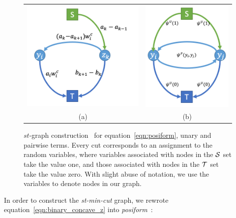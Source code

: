 \documentclass[sigconf, anonymous, review]{acmart}
\renewcommand{\cite}{\citep}
\begin{document}
\begin{figure}[t]
  \centering
  \setlength{\tabcolsep}{2pt}
  \begin{tabular}{cc}
    \includegraphics[width=0.54\columnwidth]{Methodology/figures/ho.png}&
                                                                         \includegraphics[width=0.4\columnwidth]{Methodology/figures/up.png}\\
                                                                         {\small (a)} & {\small (b)} 
  \end{tabular}
  \caption{\label{fig:stmincut} $st$-graph
    construction~\cite{gouldlearning} for
    equation~\eqref{eqn:posiform}, unary and pairwise terms.
    Every cut corresponds to an assignment to the random
    variables, where variables associated with nodes in the
    ${\cal S}$ set take the value one, and those associated with
    nodes in the $\T$ set take the value zero. With slight abuse
    of notation, we use the variables to denote nodes in our
    graph.}
\end{figure}



In order to construct the \emph{st-min-cut} graph, we rewrote
equation~\eqref{eqn:binary_concave_z} into
\emph{posiform}~\cite{Boros:MATH02}:
\end{document}

